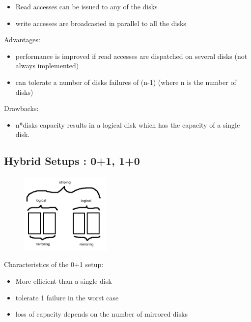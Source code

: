 \documentclass[a4paper,10pt]{report}
\begin{document}
\begin{itemize}
  \item Read accesses can be issued to any of the disks
  \item write accesses are broadcasted in parallel to all the disks
\end{itemize}

Advantages:

\begin{itemize}
  \item performance is improved if read accesses are dispatched on several disks (not always implemented)
  \item can tolerate a number of disks failures of (n-1) (where n is the number of disks)
\end{itemize}

Drawbacks:

\begin{itemize}
  \item n*disks capacity results in a logical disk which has the capacity of a single disk. 
\end{itemize}

\subsection{Hybrid Setups : 0+1, 1+0}
\begin{figure}[h!]
  \begin{center}
    \includegraphics[width=0.4\textwidth]{0_plus_1.png}
    \caption{}
  \end{center}
\end{figure}

Characteristics of the 0+1 setup:
\begin{itemize}
  \item More efficient than a single disk
  \item tolerate 1 failure in the worst case
  \item loss of capacity depends on the number of mirrored disks
\end{itemize}
\end{document}
